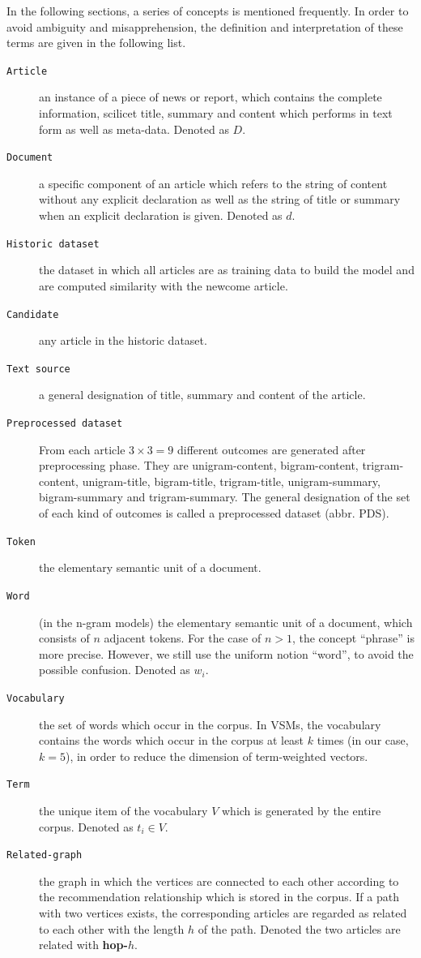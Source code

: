 In the following sections, a series of concepts is mentioned frequently. In order to avoid ambiguity and misapprehension, the definition and interpretation of these terms are given in the following list.

\begin{description}
\item[\texttt{Article}] an instance of a piece of news or report, which contains the complete information, scilicet title, summary and content which performs in text form as well as meta-data. Denoted as $D$.
\item[\texttt{Document}] a specific component of an article which refers to the string of content without any explicit declaration as well as the string of title or summary when an explicit declaration is given. Denoted as $d$.
\item[\texttt{Historic dataset}] the dataset in which all articles are as training data to build the model and are computed similarity with the newcome article. 
\item[\texttt{Candidate}] any article in the historic dataset.
\item[\texttt{Text source}] a general designation of title, summary and content of the article.
\item[\texttt{Preprocessed dataset}] From each article $3\times3=9$ different outcomes are generated after preprocessing phase. They are unigram-content, bigram-content, trigram-content, unigram-title, bigram-title, trigram-title, unigram-summary, bigram-summary and trigram-summary. The general designation of the set of each kind of outcomes is called a preprocessed dataset (abbr. PDS). 
\item[\texttt{Token}] the elementary semantic unit of a document.
\item[\texttt{Word}] (in the n-gram models) the elementary semantic unit of a document, which consists of $n$ adjacent tokens. For the case of $n > 1$, the concept ``phrase'' is more precise. However, we still use the uniform notion ``word'', to avoid the possible confusion. Denoted as $w_i$. 
\item[\texttt{Vocabulary}] the set of words which occur in the corpus. In VSMs, the vocabulary contains the words which occur in the corpus at least $k$ times (in our case, $k=5$), in order to reduce the dimension of term-weighted vectors. 
\item[\texttt{Term}] the unique item of the vocabulary $V$ which is generated by the entire corpus. Denoted as $t_i \in V$. 
\item[\texttt{Related-graph}] the graph in which the vertices are connected to each other according to the recommendation relationship which is stored in the corpus. If a path with two vertices exists, the corresponding articles are regarded as related to each other with the length $h$ of the path. Denoted the two articles are related with \textbf{hop-$h$}.

\label{tab:def_terms}
\end{description}


